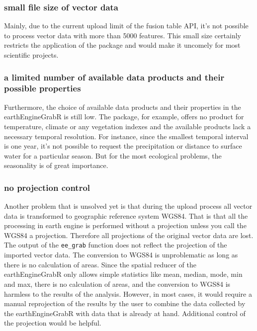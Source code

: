 \subsubsection{small file size of vector data}

Mainly, due to the current upload limit of the fusion table API, it's not possible to process vector data with more than 5000 features. This small size certainly restricts the application of the package and would make it uncomely for most scientific projects. 

\subsubsection{a limited number of available data products and their possible properties}

Furthermore, the choice of available data products and their properties in the earthEngineGrabR is still low. The package, for example, offers no product for temperature, climate or any vegetation indexes and the available products lack a necessary temporal resolution. For instance, since the smallest temporal interval is one year, it's not possible to request the precipitation or distance to surface water for a particular season. But for the most ecological problems, the seasonality is of great importance.

\subsubsection{no projection control}

Another problem that is unsolved yet is that during the upload process all vector data is transformed to geographic reference system WGS84. That is that all the processing in earth engine is performed without a projection unless you call the WGS84 a projection. Therefore all projections of the original vector data are lost. The output of the \texttt{ee\_grab} function does not reflect the projection of the imported vector data. The conversion to WGS84 is unproblematic as long as there is no calculation of areas. Since the spatial reducer of the earthEngineGrabR only allows simple statistics like mean, median, mode, min and max, there is no calculation of areas, and the conversion to WGS84 is harmless to the results of the analysis. However, in most cases, it would require a manual reprojection of the results by the user to combine the data collected by the earthEngineGrabR with data that is already at hand. Additional control of the projection would be helpful.

